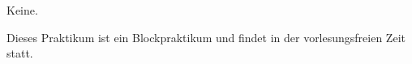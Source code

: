 \begin{course}

\setdoclanguagegerman
{}
\coursecoordination{}


\courseterm{}

\coursehead


\label{cour_14463.dp_997}


\begin{styleenv}
\begin{assessment}

\end{assessment}

\begin{conditions}Keine.\end{conditions}


\end{styleenv}

\begin{learningoutcomes}

\end{learningoutcomes}

\begin{content}

\end{content}





\begin{remarks}Dieses Praktikum ist ein Blockpraktikum und findet in der vorlesungsfreien Zeit statt.

\end{remarks}

\end{course}